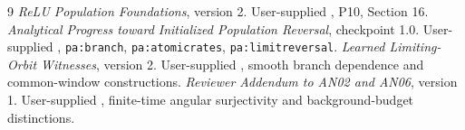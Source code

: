 \documentclass[11pt]{article}
\numberwithin{equation}{section}
\theoremstyle{remark}\newtheorem{remark}[theorem]{Remark}
\begin{document}
\begin{thebibliography}{9}
 \emph{ReLU Population Foundations}, version 2.
User-supplied , P10, Section 16.
 \emph{Analytical Progress toward Initialized Population Reversal},
checkpoint 1.0. User-supplied ,
\texttt{pa:branch}, \texttt{pa:atomicrates}, \texttt{pa:limitreversal}.
 \emph{Learned Limiting-Orbit Witnesses}, version 2.
User-supplied , smooth branch
dependence and common-window constructions.
 \emph{Reviewer Addendum to AN02 and AN06}, version 1.
User-supplied , finite-time angular
surjectivity and background-budget distinctions.
\end{thebibliography}
\end{document}
